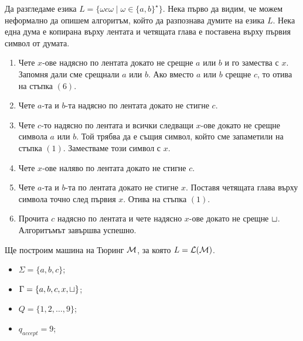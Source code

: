 \begin{example}
  Да разгледаме езика $L = \{\omega c \omega \mid \omega\in\{a,b\}^\star\}$.
  Нека първо да видим, че можем неформално да опишем алгоритъм, който да разпознава думите на езика $L$.
  Нека една дума е копирана върху лентата и четящата глава е поставена върху първия символ от думата.
  \begin{enumerate}[(1)]
  \item 
    Чете $x$-ове надясно по лентата докато не срещне $a$ или $b$ и го замества с $x$.
    Запомня дали сме срещнали $a$ или $b$.
    Ако вместо $a$ или $b$ срещне $c$, то отива на стъпка $(6)$.
  \item
    Чете $a$-та и $b$-та надясно по лентата докато не стигне $c$. 
  \item
    Чете $c$-то надясно по лентата и всички следващи $x$-ове докато не срещне символа $a$ или $b$.
    Той трябва да е същия символ, който сме запаметили на стъпка $(1)$.
    Заместваме този символ с $x$.
  \item
    Чете $x$-ове наляво по лентата докато не стигне $c$.
  \item
    Чете $a$-та и $b$-та по лентата докато не стигне $x$.
    Поставя четящата глава върху символа точно след първия $x$.
    Отива на стъпка $(1)$.
  \item
    Прочита $c$ надясно по лентата и чете надясно $x$-ове докато не срещне $\sqcup$.
    Алгоритъмът завършва успешно.
  \end{enumerate}

  Ще построим машина на Тюринг $\mathcal{M}$, за която $L = \mathcal{L}(\mathcal{M})$.
  \begin{itemize}
  \item 
    $\Sigma = \{a,b,c\}$;
  \item
    $\Gamma = \{a,b,c,x,\sqcup\}$;
  \item
    $Q = \{1,2,\dots,9\}$;
  \item
    $q_{accept} = 9$;
  \end{itemize}

  \begin{figure}[H]
    \begin{center}
\end{center}
\end{figure}
\end{example}
